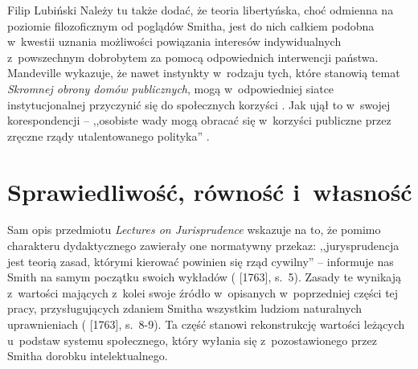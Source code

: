 \begin{artplenv}{Filip Lubiński}
 Należy tu także dodać, że teoria libertyńska, choć odmienna na poziomie filozoficznym od poglądów Smitha, jest do
nich całkiem podobna w~kwestii uznania możliwości powiązania interesów indywidualnych z~powszechnym dobrobytem za
pomocą odpowiednich interwencji państwa. Mandeville wykazuje, że nawet instynkty w~rodzaju tych, które stanowią temat
\textit{Skromnej obrony domów publicznych}, mogą w~odpowiedniej siatce instytucjonalnej przyczynić się do społecznych
korzyści
\parencite{mandeville_skromna_2016}.
Jak ujął to w~swojej korespondencji -- ,,osobiste wady mogą obracać
się w~korzyści publiczne przez zręczne rządy utalentowanego polityka''
\parencite[ s.~37]{mandeville_letter_1953}.

\section{Sprawiedliwość, równość i~własność}
Sam opis przedmiotu \textit{Lectures on Jurisprudence} wskazuje na to, że pomimo charakteru dydaktycznego zawierały
one normatywny przekaz: ,,jurysprudencja jest teorią zasad, którymi kierować powinien się rząd cywilny'' -- informuje nas
Smith na samym początku swoich wykładów
(\cite{smith_lectures_1982} [1763], s.~5).
Zasady te
wynikają z~wartości mających z~kolei swoje źródło w~opisanych w~poprzedniej części tej pracy, przysługujących zdaniem Smitha
wszystkim ludziom naturalnych uprawnieniach
(\cite{smith_lectures_1982} [1763], s.~8-9).
Ta część stanowi
rekonstrukcję wartości leżących u~podstaw systemu społecznego, który wyłania się z~pozostawionego przez Smitha dorobku
intelektualnego.


\end{artplenv}
